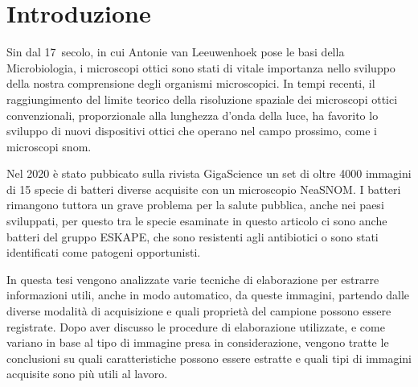 \documentclass[../main.tex]{subfiles}
\begin{document}
\chapter*{Introduzione}
Sin dal 17\textdegree\ secolo, in cui Antonie van Leeuwenhoek pose le basi della Microbiologia\cite{lane_2015, dobell_1923, corliss_1975}, i microscopi ottici sono stati di vitale importanza nello sviluppo della nostra comprensione degli organismi microscopici.
In tempi recenti, il raggiungimento del limite teorico della risoluzione spaziale dei microscopi ottici convenzionali, proporzionale alla lunghezza d'onda della luce, ha favorito lo sviluppo di nuovi dispositivi ottici che operano nel campo prossimo, come i microscopi \gls{snom}\cite{ohtsu_2020}.

Nel 2020 è stato pubbicato sulla rivista GigaScience un set di oltre 4000 immagini di 15 specie di batteri diverse acquisite con un microscopio NeaSNOM\cite{ssnombacter}. I batteri rimangono tuttora un grave problema per la salute pubblica, anche nei paesi sviluppati, per questo tra le specie esaminate in questo articolo ci sono anche batteri del gruppo ESKAPE, che sono resistenti agli antibiotici o sono stati identificati come patogeni opportunisti.\cite{eskape}

In questa tesi vengono analizzate varie tecniche di elaborazione per estrarre informazioni utili, anche in modo automatico, da queste immagini, partendo dalle diverse modalità di acquisizione e quali proprietà del campione possono essere registrate.
Dopo aver discusso le procedure di elaborazione utilizzate, e come variano in base al tipo di immagine presa in considerazione, vengono tratte le conclusioni su quali caratteristiche possono essere estratte e quali tipi di immagini acquisite sono più utili al lavoro.
\end{document}
